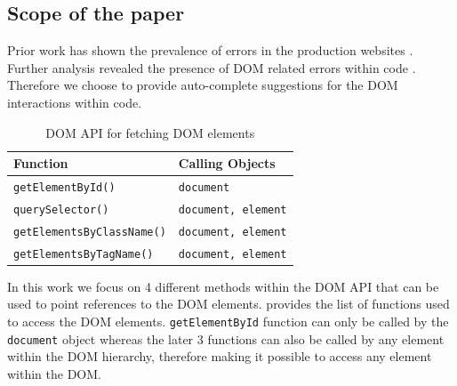 	\subsection{Scope of the paper}
	\label{Sec:Scope}
	
	Prior work  has shown the prevalence of \javascript errors in the production websites \cite{ocariza2011javascript}. Further analysis revealed the presence of DOM related errors within \javascript code \cite{ocariza2013empirical}. Therefore we choose to provide auto-complete suggestions for the DOM interactions within \javascript code. 
	
	\begin{table}
	{
		\scriptsize
		\begin{tabular}{ p{3.8cm} | p{3.8cm}}
  			\hline                        
  			\textbf{Function} & \textbf{Calling Objects} \\ \hline \hline
  			\texttt{getElementById()} & \texttt{document} \\ \hline
			\texttt{querySelector()} & \texttt{document, element} \\ \hline
			\texttt{getElementsByClassName()} & \texttt{document, element} \\ \hline
			\texttt{getElementsByTagName()} & \texttt{document, element} \\
  			\hline  
		\end{tabular}
	}
	\caption {DOM API for fetching DOM elements}
	\label{Table:API}		
	\end{table}

	
	In this work we focus on 4 different methods within the DOM API that can be used to point references to the DOM elements.  provides the list of functions used to access the DOM elements. \texttt{getElementById} function can only be called by the \texttt{document} object whereas the later 3 functions can also be called by any element within the DOM hierarchy, therefore making it possible to access any element within the DOM.
	
	
	